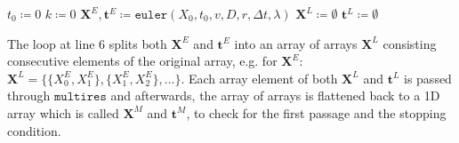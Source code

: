 \documentclass[preprint,12pt]{elsarticle}
\numberwithin{equation}{section}
\theoremstyle{plain} \newtheorem{theorem}{Theorem}[section]
\theoremstyle{plain} \newtheorem{proposition}[theorem]{Proposition}
\theoremstyle{plain} \newtheorem{lemma}[theorem]{Lemma}
\theoremstyle{plain} \newtheorem{corollary}[theorem]{Corollary}
\theoremstyle{definition} \newtheorem{definition}[theorem]{Definition}
\theoremstyle{definition} \newtheorem{notation}[theorem]{Notation}
\theoremstyle{remark} \newtheorem{remark}[theorem]{Remark}
\theoremstyle{remark} \newtheorem{remarks}[theorem]{Remarks}
\theoremstyle{remark} \newtheorem{algorithm2}[theorem]{Algorithm}
\theoremstyle{remark} \newtheorem{example}[theorem]{Example}
\begin{document}
\begin{appendices}
\begin{algorithm}[H]
\caption{HMRA}
\LinesNumbered
{}
$t_0 \coloneqq 0$ \;
$k \coloneqq 0$ \;
$\mathbf{X}^E, \mathbf{t}^E \coloneqq \texttt{euler}(X_0,t_0,v,D,r,\Delta t, \lambda)$ \;
$\mathbf{X}^L \coloneqq \emptyset$ \;
$\mathbf{t}^L \coloneqq \emptyset$ \;
\end{algorithm}
\vspace{2mm}
The loop at line 6 splits both $\mathbf{X}^E$ and $\mathbf{t}^E$ into an array of arrays $\mathbf{X}^L$ consisting consecutive elements of the original array, e.g. for $\mathbf{X}^E$: $\mathbf{X}^L = \{\{X^E_0, X^E_1\}, \{X^E_1, X^E_2\}, \ldots \}$. Each array element of both $\mathbf{X}^L$ and $\mathbf{t}^L$ is passed through $\texttt{multires}$ and afterwards, the array of arrays is flattened back to a 1D array which is called $\mathbf{X}^M$ and $\mathbf{t}^M$, to check for the first passage and the stopping condition.

\newpage

\end{appendices}
\end{document}
